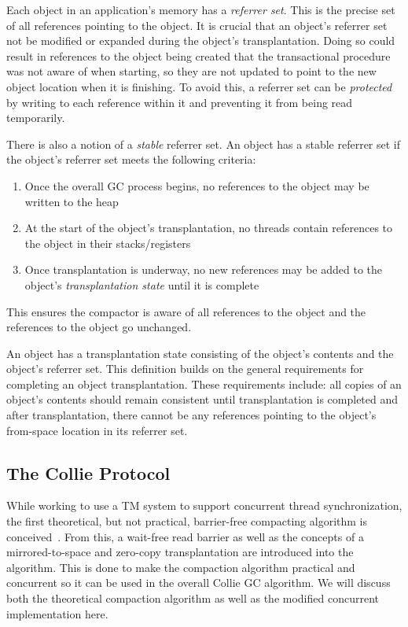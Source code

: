 \documentclass{sig-alternate}
\begin{document}
Each object in an application's memory has a \emph{referrer set}. This is the precise set 
of all references pointing to the object. It is crucial that an object's referrer set not
be modified or expanded during the object's transplantation. Doing so could result
in references to the object being created that the transactional procedure
was not aware of when starting, so they are not updated to point to 
the new object location when it is finishing. To avoid this, a referrer set can be
\emph{protected} by writing to each reference within it and preventing it from
being read temporarily.

There is also a notion of a \emph{stable} referrer set. An object has a stable referrer 
set if the object's referrer set meets the following criteria:
\begin{enumerate}
\item Once the overall GC process begins, no references to the object may be written to the heap
\item At the start of the object's transplantation, no threads contain references to the object in their stacks/registers
\item Once transplantation is underway, no new references may be added to the object's \emph{transplantation state} until it is complete
\end{enumerate}
This ensures the compactor is aware of all references to the object
and the references to the object go unchanged.

An object has a transplantation state consisting of the object's contents 
and the object's referrer set. This definition builds on the general requirements
for completing an object transplantation. These
requirements include: all copies of an object's contents should remain consistent
until transplantation is completed and after transplantation, there cannot be any
references pointing to the object's from-space location in its referrer set.



\subsection{The Collie Protocol}
\label{sec:collieAlgorithm}

While working to use a TM system to support concurrent thread 
synchronization, the first theoretical, 
but not practical, barrier-free compacting algorithm is 
conceived~\cite{Iyengar:Collie}. From this,
a wait-free read barrier as well as
the concepts of a mirrored-to-space and 
zero-copy transplantation are introduced into the algorithm.
This is done to make the compaction algorithm practical and concurrent
so it can be used in the overall Collie GC algorithm.
We will discuss both the theoretical compaction algorithm as well
as the modified concurrent implementation here.
\end{document}
